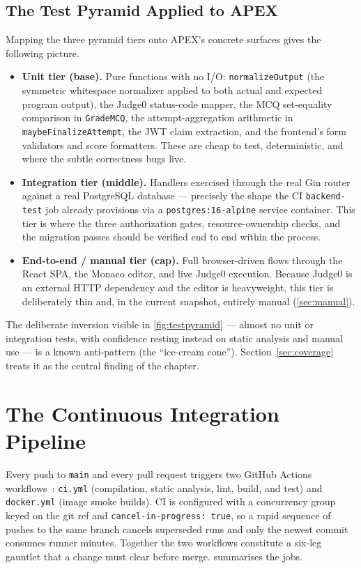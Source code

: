 \subsection{The Test Pyramid Applied to APEX}

Mapping the three pyramid tiers onto APEX's concrete surfaces gives the
following picture.

\begin{itemize}
  \item \textbf{Unit tier (base).} Pure functions with no I/O:
  \texttt{normalizeOutput} (the symmetric whitespace normalizer applied
  to both actual and expected program output), the Judge0 status-code
  mapper, the MCQ set-equality comparison in \texttt{GradeMCQ}, the
  attempt-aggregation arithmetic in \texttt{maybeFinalizeAttempt}, the
  JWT claim extraction, and the frontend's form validators and score
  formatters. These are cheap to test, deterministic, and where the
  subtle correctness bugs live.

  \item \textbf{Integration tier (middle).} Handlers exercised through
  the real Gin router against a real PostgreSQL database --- precisely
  the shape the CI \texttt{backend-test} job already provisions via a
  \texttt{postgres:16-alpine} service container. This tier is where the
  three authorization gates, resource-ownership checks, and the
  migration passes should be verified end to end within the process.

  \item \textbf{End-to-end / manual tier (cap).} Full browser-driven
  flows through the React SPA, the Monaco editor, and live Judge0
  execution. Because Judge0 is an external HTTP dependency and the
  editor is heavyweight, this tier is deliberately thin and, in the
  current snapshot, entirely manual (\cref{sec:manual}).
\end{itemize}

The deliberate inversion visible in \cref{fig:testpyramid} --- almost no
unit or integration tests, with confidence resting instead on static
analysis and manual use --- is a known anti-pattern (the ``ice-cream
cone''). Section~\ref{sec:coverage} treats it as the central
finding of the chapter.

\section{The Continuous Integration Pipeline}

Every push to \texttt{main} and every pull request triggers two GitHub
Actions workflows~\cite{githubactions}: \texttt{ci.yml} (compilation,
static analysis, lint, build, and test) and \texttt{docker.yml} (image
smoke builds). CI is configured with a concurrency group keyed on the
git ref and \texttt{cancel-in-progress: true}, so a rapid sequence of
pushes to the same branch cancels superseded runs and only the newest
commit consumes runner minutes. Together the two workflows constitute a
six-leg gauntlet that a change must clear before merge. 
summarises the jobs.

